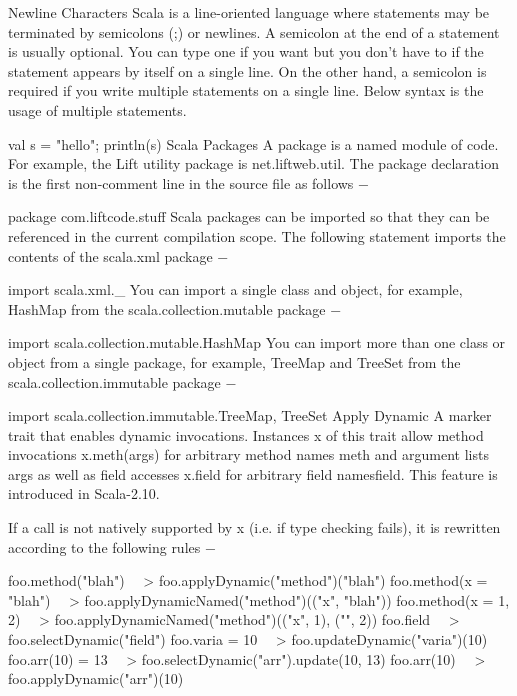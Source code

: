 Newline Characters
Scala is a line-oriented language where statements may be terminated by semicolons (;) or newlines. A semicolon at the end of a statement is usually optional. You can type one if you want but you don't have to if the statement appears by itself on a single line. On the other hand, a semicolon is required if you write multiple statements on a single line. Below syntax is the usage of multiple statements.

val s = "hello"; println(s)
Scala Packages
A package is a named module of code. For example, the Lift utility package is net.liftweb.util. The package declaration is the first non-comment line in the source file as follows −

package com.liftcode.stuff
Scala packages can be imported so that they can be referenced in the current compilation scope. The following statement imports the contents of the scala.xml package −

import scala.xml._
You can import a single class and object, for example, HashMap from the scala.collection.mutable package −

import scala.collection.mutable.HashMap
You can import more than one class or object from a single package, for example, TreeMap and TreeSet from the scala.collection.immutable package −

import scala.collection.immutable.{TreeMap, TreeSet}
Apply Dynamic
A marker trait that enables dynamic invocations. Instances x of this trait allow method invocations x.meth(args) for arbitrary method names meth and argument lists args as well as field accesses x.field for arbitrary field namesfield. This feature is introduced in Scala-2.10.

If a call is not natively supported by x (i.e. if type checking fails), it is rewritten according to the following rules −

foo.method("blah") ~~> foo.applyDynamic("method")("blah")
foo.method(x = "blah") ~~> foo.applyDynamicNamed("method")(("x", "blah"))
foo.method(x = 1, 2) ~~> foo.applyDynamicNamed("method")(("x", 1), ("", 2))
foo.field ~~> foo.selectDynamic("field")
foo.varia = 10 ~~> foo.updateDynamic("varia")(10)
foo.arr(10) = 13 ~~> foo.selectDynamic("arr").update(10, 13)
foo.arr(10) ~~> foo.applyDynamic("arr")(10)

